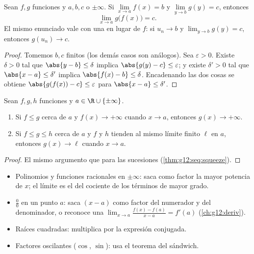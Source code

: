 \begin{theorem}\label{thm:g12:limcont:composition}
Sean $f, g$ funciones y $a, b, c$  o $\pm\infty$. Si
$\lim\limits_{x \to a} f(x) = b$ y $\lim\limits_{y \to b} g(y) = c$,
entonces
\[
\lim_{x \to a} g\bigl(f(x)\bigr) = c .
\]
El mismo enunciado vale con una  en lugar de $f$: si $u_n \to b$ y
$\lim_{y\to b} g(y) = c$, entonces $g(u_n) \to c$.
\end{theorem}

\begin{proof}
Tomemos $b, c$ finitos (los demás casos son análogos). Sea
$\varepsilon > 0$. Existe $\delta > 0$ tal que $\abs{y - b} \leq \delta$
implica $\abs{g(y) - c} \leq \varepsilon$; y existe $\delta' > 0$ tal que
$\abs{x - a} \leq \delta'$ implica $\abs{f(x) - b} \leq \delta$.
Encadenando las dos cosas se obtiene $\abs{g(f(x)) - c} \leq \varepsilon$
para $\abs{x - a} \leq \delta'$.
\end{proof}

\begin{theorem}\label{thm:g12:limcont:squeeze}
Sean $f, g, h$ funciones y $a \in \R \cup \{\pm\infty\}$.
\begin{enumerate}
  \item Si $f \leq g$ cerca de $a$ y $f(x) \to +\infty$ cuando $x \to a$,
        entonces $g(x) \to +\infty$.
  \item Si $f \leq g \leq h$ cerca de $a$ y $f$ y $h$ tienden al mismo
        límite finito $\ell$ en $a$, entonces $g(x) \to \ell$ cuando
        $x \to a$.
\end{enumerate}
\end{theorem}

\begin{proof}
El mismo argumento que para las sucesiones
(\cref{thm:g12:seq:squeeze}).
\end{proof}

\begin{method}\label{met:g12:limcont:limits}
\begin{itemize}
  \item Polinomios y funciones racionales en $\pm\infty$: saca como factor
        la mayor potencia de $x$; el límite es el del cociente de los
        términos de mayor grado.
  \item $\frac{0}{0}$ en un punto $a$: saca $(x-a)$ como factor del
        numerador y del denominador, o reconoce una 
        $\lim_{x\to a}\frac{f(x)-f(a)}{x-a} = f'(a)$
        (\cref{ch:g12:deriv}).
  \item Raíces cuadradas: multiplica por la expresión conjugada.
  \item Factores oscilantes ($\cos$, $\sin$): usa el teorema del sándwich.
\end{itemize}
\end{method}

